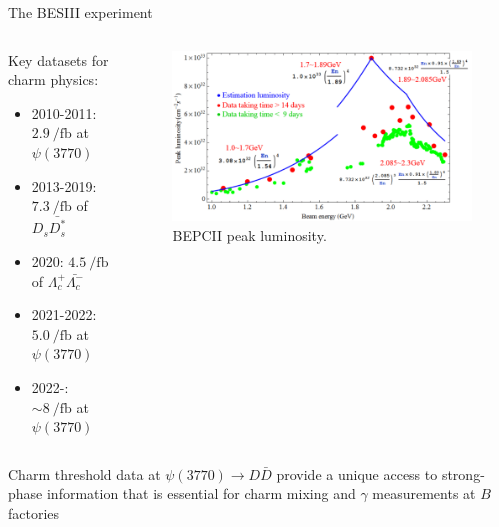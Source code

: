 \documentclass{beamer}
\begin{document}
\begin{frame}{The BESIII experiment}
  \begin{columns}
    \begin{column}{0.5\textwidth}
      \vspace{0.0cm}
      {\large Key datasets for charm physics:}
      \begin{itemize}
      \item[\ding{217}]{2010-2011: $\SI{2.9}{\per\femto\barn}$ at $\psi(3770)$}
      \item{2013-2019: $\SI{7.3}{\per\femto\barn}$ of $D_s\bar{D_s^*}$}
      \item{2020: $\SI{4.5}{\per\femto\barn}$ of $\Lambda_c^+\bar{\Lambda_c^-}$}
      \item[\ding{217}]{2021-2022: $\SI{5.0}{\per\femto\barn}$ at $\psi(3770)$}
      \item[\ding{217}]{2022-: $\sim\SI{8}{\per\femto\barn}$ at $\psi(3770)$}
      \end{itemize}
    \end{column}
    \begin{column}{0.5\textwidth}
      \vspace{0.5cm}
      \begin{figure}
        \includegraphics[width=1.0\textwidth]{Figures/BEPCII_Luminosity.png}
        \caption*{BEPCII peak luminosity.}
      \end{figure}
    \end{column}
  \end{columns}
  \begin{block}{}
    Charm threshold data at $\psi(3770)\to D\bar{D}$ provide a unique access to strong-phase information that is essential for charm mixing and $\gamma$ measurements at $B$ factories
  \end{block}
\end{frame}
\end{document}
